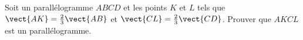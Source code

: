 
\begin{exercice}\label{exoSeconde-0093}

    Soit un parallélogramme \( ABCD\) et les points \( K\) et \( L\) tels que \( \vect{ AK }=\frac{ 2 }{ 3 }\vect{ AB }\) et \( \vect{ CL }=\frac{ 2 }{ 3 }\vect{ CD }\). Prouver que \( AKCL\) est un parallélogramme.

\end{exercice}

